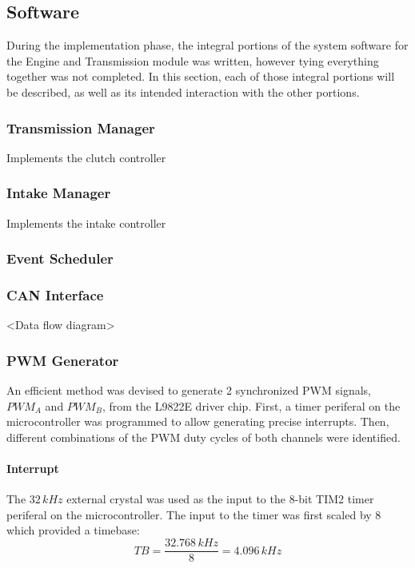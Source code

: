 \subsection{Software}

During the implementation phase, the integral portions of the system software for the Engine and Transmission module was written, however tying everything together was not completed. In this section, each of those integral portions will be described, as well as its intended interaction with the other portions.


\subsubsection{Transmission Manager}

Implements the clutch controller

\subsubsection{Intake Manager}

Implements the intake controller

\subsubsection{Event Scheduler}


\subsubsection{CAN Interface}

<Data flow diagram>


\subsubsection{PWM Generator}

An efficient method was devised to generate 2 synchronized PWM signals, $PWM_A$ and $PWM_B$, from the L9822E driver chip. First, a timer periferal on the microcontroller was programmed to allow generating precise interrupts. Then, different combinations of the PWM duty cycles of both channels were identified.

\paragraph{Interrupt}
The $32\, kHz$ external crystal was used as the input to the 8-bit TIM2 timer periferal on the microcontroller. The input to the timer was first scaled by 8 which provided a timebase:
\begin{equation}
TB=\frac{32.768\, kHz}{8}=4.096\, kHz
\end{equation}

